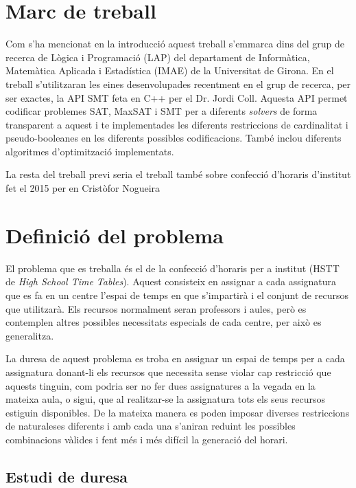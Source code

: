 \documentclass[11pt,a4paper,twoside]{report}
\begin{document}
  \section{Marc de treball}
    Com s'ha mencionat en la introducció aquest treball s'emmarca dins del grup de recerca de Lògica i Programació (LAP) del departament de Informàtica, Matemàtica Aplicada i Estadística (IMAE) de la Universitat de Girona. 
    En el treball s'utilitzaran les eines desenvolupades recentment en el grup de recerca, per ser exactes, la API SMT feta en C++ per el Dr. Jordi Coll. 
    Aquesta API permet codificar problemes SAT, MaxSAT i SMT per a diferents \textit{solvers} de forma transparent a aquest i te implementades les diferents restriccions de cardinalitat i pseudo-booleanes en les diferents possibles codificacions. 
    També inclou diferents algoritmes d'optimització implementats.

    La resta del treball previ seria el treball també sobre confecció d'horaris d'institut fet el 2015 per en Cristòfor Nogueira\cite{treballCristo}

  \section{Definició del problema}
    El problema que es treballa és el de la confecció d'horaris per a institut (HSTT de \textit{High School Time Tables}). 
    Aquest consisteix en assignar a cada assignatura que es fa en un centre l'espai de temps en que s'impartirà i el conjunt de recursos que utilitzarà. 
    Els recursos normalment seran professors i aules, però es contemplen altres possibles necessitats especials de cada centre, per això es generalitza.

    La duresa de aquest problema es troba en assignar un espai de temps per a cada assignatura donant-li els recursos que necessita sense violar cap restricció que aquests tinguin, 
    com podria ser no fer dues assignatures a la vegada en la mateixa aula, o sigui, que al realitzar-se la assignatura tots els seus recursos estiguin disponibles.  
    De la mateixa manera es poden imposar diverses restriccions de naturaleses diferents i amb cada una s'aniran reduint les possibles combinacions vàlides i fent més i més difícil la generació del horari.
    \subsection{Estudi de duresa}
\end{document}
